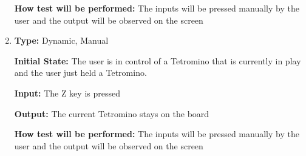 \documentclass[12pt, titlepage]{article}
\begin{document}
\begin{enumerate}[{FR-CI-}1. ]
		\textbf{How test will be performed:} The inputs will be pressed manually by the user and the output will be observed on the screen
		
		\item
		\textbf{Type:} Dynamic, Manual
		
		\textbf{Initial State:} The user is in control of a Tetromino that is currently in play and the user just held a Tetromino.
		
		\textbf{Input:} The Z key is pressed 
		
		\textbf{Output:} The current Tetromino stays on the board
		
		\textbf{How test will be performed:} The inputs will be pressed manually by the user and the output will be observed on the screen
	\end{enumerate}
	
\end{document}
